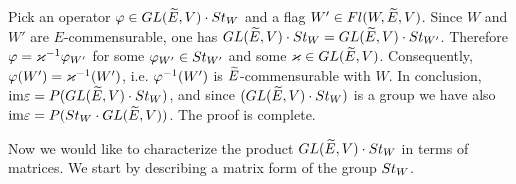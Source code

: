 \documentclass[11pt, a4paper]{article}
\begin{document}
Pick an operator $\varphi\in GL(\widetilde E,V)\cdot St_W$ and a flag $W'\in Fl(W,\widetilde{E},V)$. Since $W$ and $W'$ are $E$-commensurable, one has $GL(\widetilde E,V)\cdot St_{W}=GL(\widetilde{E},V)\cdot St_{W'}$. %
Therefore $\varphi=\varkappa^{-1} \varphi_{W'}$ for some $\varphi_{W'}\in St_{W'}$  and some $\varkappa\in GL(\widetilde{E},V)$. Consequently,   $\varphi(W')=\varkappa^{-1}(W')$, %
i.e. $\varphi^{-1}(W')$ is $\widetilde E$-commensurable with $W$. In conclusion, $\mathrm{im} \varepsilon=P(GL(\widetilde E,V)\cdot St_{W})$, and since $(GL(\widetilde E,V)\cdot St_{W})$ is a group we have also $\mathrm{im} \varepsilon=P( St_{W} \cdot GL(\widetilde E,V))$. The proof is complete.
 
 
\label{sect_explicit_matrix_form}
 
Now we would like to characterize the product $GL(\widetilde{E},V)\cdot St_W$ in terms of matrices. We start by describing a matrix form of the group $St_W$.
\end{document}

